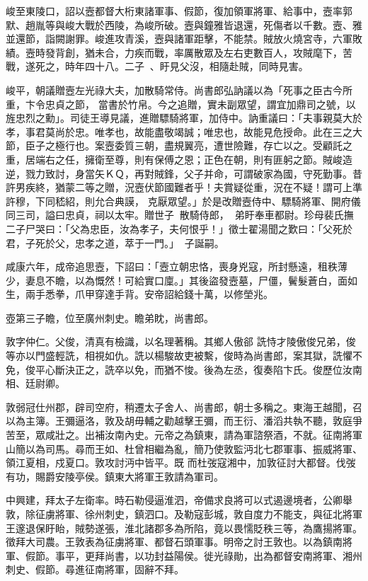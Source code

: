 \begin{pinyinscope}
 峻至東陵口，詔以壼都督大桁東諸軍事、假節，復加領軍將軍、給事中，壼率郭默、趙胤等與峻大戰於西陵，為峻所破。壼與鐘雅皆退還，死傷者以千數。壼、雅並還節，詣闕謝罪。峻進攻青溪，壼與諸軍距擊，不能禁。賊放火燒宮寺，六軍敗績。壼時發背創，猶未合，力疾而戰，率厲散眾及左右吏數百人，攻賊麾下，苦戰，遂死之，時年四十八。二子、盱見父沒，相隨赴賊，同時見害。



 峻平，朝議贈壼左光祿大夫，加散騎常侍。尚書郎弘訥議以為「死事之臣古今所重，卞令忠貞之節，
 當書於竹帛。今之追贈，實未副眾望，謂宜加鼎司之號，以旌忠烈之勳」。司徒王導見議，進贈驃騎將軍，加侍中。訥重議曰：「夫事親莫大於孝，事君莫尚於忠。唯孝也，故能盡敬竭誠；唯忠也，故能見危授命。此在三之大節，臣子之極行也。案壼委質三朝，盡規翼亮，遭世險難，存亡以之。受顧託之重，居端右之任，擁衛至尊，則有保傅之恩；正色在朝，則有匪躬之節。賊峻造逆，戮力致討，身當矢ＫＱ，再對賊鋒，父子并命，可謂破家為國，守死勤事。昔許男疾終，猶蒙二等之贈，況壼伏節國難者乎！夫賞疑從重，況在不疑！謂可上準許穆，下同嵇紹，則允合典謨，
 克厭眾望。」於是改贈壼侍中、驃騎將軍、開府儀同三司，謚曰忠貞，祠以太牢。贈世子散騎侍郎，弟盱奉車都尉。珍母裴氏撫二子尸哭曰：「父為忠臣，汝為孝子，夫何恨乎！」徵士翟湯聞之歎曰：「父死於君，子死於父，忠孝之道，萃于一門。」子誕嗣。



 咸康六年，成帝追思壼，下詔曰：「壼立朝忠恪，喪身兇寇，所封懸遠，租秩薄少，妻息不瞻，以為慨然！可給實口廩。」其後盜發壼墓，尸僵，鬢髮蒼白，面如生，兩手悉拳，爪甲穿達手背。安帝詔給錢十萬，以修塋兆。



 壺第三子瞻，位至廣州刺史。瞻弟眈，尚書郎。



 敦字仲仁。父俊，清真有檢識，以名理著稱。其鄉人傲郤
 詵恃才陵傲俊兄弟，俊等亦以門盛輕詵，相視如仇。詵以楊駿故吏被繫，俊時為尚書郎，案其獄，詵懼不免，俊平心斷決正之，詵卒以免，而猶不悛。後為左丞，復奏陷卞氏。俊歷位汝南相、廷尉卿。



 敦弱冠仕州郡，辟司空府，稍遷太子舍人、尚書郎，朝士多稱之。東海王越聞，召以為主簿。王彌逼洛，敦及胡毋輔之勸越擊王彌，而王衍、潘滔共執不聽，敦庭爭苦至，眾咸壯之。出補汝南內史。元帝之為鎮東，請為軍諮祭酒，不就。征南將軍山簡以為司馬。尋而王如、杜曾相繼為亂，簡乃使敦監沔北七郡軍事、振威將軍、領江夏相，戍夏口。敦攻討沔中皆平。既
 而杜弢寇湘中，加敦征討大都督。伐弢有功，賜爵安陵亭侯。鎮東大將軍王敦請為軍司。



 中興建，拜太子左衛率。時石勒侵逼淮泗，帝備求良將可以式遏邊境者，公卿舉敦，除征虜將軍、徐州刺史，鎮泗口。及勒寇彭城，敦自度力不能支，與征北將軍王邃退保盱眙，賊勢遂張，淮北諸郡多為所陷，竟以畏懦貶秩三等，為鷹揚將軍。徵拜大司農。王敦表為征虜將軍、都督石頭軍事。明帝之討王敦也。以為鎮南將軍、假節。事平，更拜尚書，以功封益陽侯。徙光祿勛，出為都督安南將軍、湘州刺史、假節。尋進征南將軍，固辭不拜。




\end{pinyinscope}
